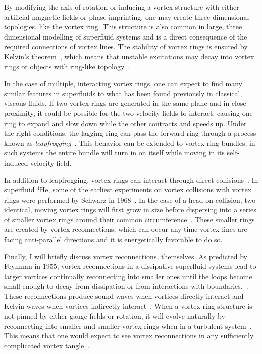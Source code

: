 By modifying the axis of rotation or inducing a vortex structure with either artificial magnetic fields or phase imprinting, one may create three-dimensional topologies, like the vortex ring.
This structure is also common in large, three dimensional modelling of superfluid systems and is a direct consequence of the required connections of vortex lines.
The stability of vortex rings is ensured by Kelvin's theorem~\cite{donnelly1991}, which means that unstable excitations may decay into vortex rings or objects with ring-like topology~\cite{anderson2001}.

In the case of multiple, interacting vortex rings, one can expect to find many similar features in superfluids to what has been found previously in classical, viscous fluids. 
If two vortex rings are generated in the same plane and in close proximity, it could be possible for the two velocity fields to interact, causing one ring to expand and slow down while the other contracts and speeds up. 
Under the right conditions, the lagging ring can pass the forward ring through a process known as \textit{leapfrogging}~\cite{sommerfield1950, caplan2014}.
This behavior can be extended to vortex ring bundles, in such systems the entire bundle will turn in on itself while moving in its self-induced velocity field.

In addition to leapfrogging, vortex rings can interact through direct collisions~\cite{shariff1992}. 
In superfluid $^4$He, some of the earliest experiments on vortex collisions with vortex rings were performed by Schwarz in 1968~\cite{schwarz1968}.
In the case of a head-on collision, two identical, moving vortex rings will first grow in size before dispersing into a series of smaller vortex rings around their common circumference~\cite{lim1995}. 
These smaller rings are created by vortex reconnections, which can occur any time vortex lines are facing anti-parallel directions and it is energetically favorable to do so.

Finally, I will briefly discuss vortex reconnections, themselves.
As predicted by Feynman in 1955, vortex reconnections in a dissipative superfluid systems lead to larger vortices continually reconnecting into smaller ones until the loops become small enough to decay from dissipation or from interactions with boundaries.~\cite{feynman1955}.
These reconnections produce sound waves when vortices directly interact and Kelvin waves when vortices indirectly interact~\cite{paoletti2011}.
When a vortex ring structure is not pinned by either gauge fields or rotation, it will evolve naturally by reconnecting into smaller and smaller vortex rings when in a turbulent system~\cite{jackson1999}. 
This means that one would expect to see vortex reconnections in any sufficiently complicated vortex tangle~\cite{barenghi2014}.

